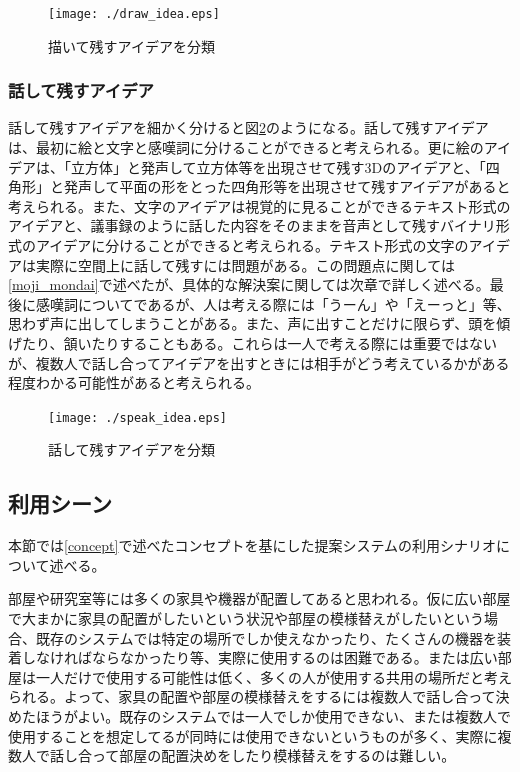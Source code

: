 \documentclass[11pt,a4j, titlepage]{jarticle} %
\begin{document}
\begin{figure}[H]
  \begin{center}
    \texttt{[image: ./draw\_idea.eps]}
    \caption{描いて残すアイデアを分類}
    \label{fig:draw_idea}
  \end{center}
\end{figure}

\subsubsection{話して残すアイデア} \label{speak_idea}
話して残すアイデアを細かく分けると図\ref{fig:speak_idea}のようになる。話して残すアイデアは、最初に絵と文字と感嘆詞に分けることができると考えられる。更に絵のアイデアは、「立方体」と発声して立方体等を出現させて残す3Dのアイデアと、「四角形」と発声して平面の形をとった四角形等を出現させて残すアイデアがあると考えられる。また、文字のアイデアは視覚的に見ることができるテキスト形式のアイデアと、議事録のように話した内容をそのままを音声として残すバイナリ形式のアイデアに分けることができると考えられる。テキスト形式の文字のアイデアは実際に空間上に話して残すには問題がある。この問題点に関しては\ref{moji_mondai}で述べたが、具体的な解決案に関しては次章で詳しく述べる。最後に感嘆詞についてであるが、人は考える際には「うーん」や「えーっと」等、思わず声に出してしまうことがある。また、声に出すことだけに限らず、頭を傾げたり、頷いたりすることもある。これらは一人で考える際には重要ではないが、複数人で話し合ってアイデアを出すときには相手がどう考えているかがある程度わかる可能性があると考えられる。

\begin{figure}[H]
  \begin{center}
    \texttt{[image: ./speak\_idea.eps]}
    \caption{話して残すアイデアを分類}
    \label{fig:speak_idea}
  \end{center}
\end{figure}

\subsection{利用シーン}
本節では\ref{concept}で述べたコンセプトを基にした提案システムの利用シナリオについて述べる。

部屋や研究室等には多くの家具や機器が配置してあると思われる。仮に広い部屋で大まかに家具の配置がしたいという状況や部屋の模様替えがしたいという場合、既存のシステムでは特定の場所でしか使えなかったり、たくさんの機器を装着しなければならなかったり等、実際に使用するのは困難である。または広い部屋は一人だけで使用する可能性は低く、多くの人が使用する共用の場所だと考えられる。よって、家具の配置や部屋の模様替えをするには複数人で話し合って決めたほうがよい。既存のシステムでは一人でしか使用できない、または複数人で使用することを想定してるが同時には使用できないというものが多く、実際に複数人で話し合って部屋の配置決めをしたり模様替えをするのは難しい。
\end{document}
